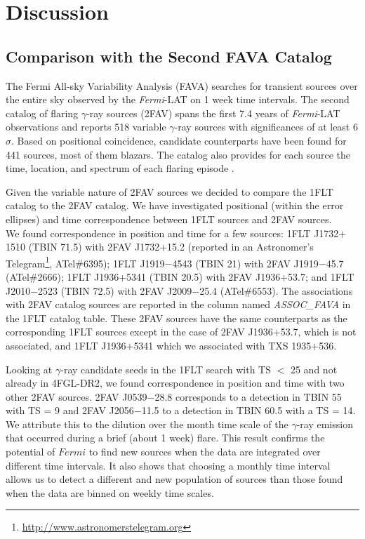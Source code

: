 \documentclass{aastex62}
\newcommand\fermilat{{\it Fermi}-LAT }
\begin{document}
\section{Discussion}\label{sec:discussion}

\subsection{Comparison with the Second FAVA Catalog}\label{sec:FAVA}
The Fermi All-sky Variability Analysis (FAVA) searches for transient sources over the entire sky observed by the \fermilat on 1 week time intervals. The second catalog of flaring $\gamma$-ray sources (2FAV) spans the first 7.4 years of \fermilat observations and reports 518 variable $\gamma$-ray sources with significances of at least 6$\sigma$. Based on positional coincidence, candidate counterparts have been found for 441 sources, most of them blazars. The catalog also provides for each source the time, location, and spectrum of each flaring episode \citep{abdollahi2017second2FAV}.

Given the variable nature of 2FAV sources we decided to compare the 1FLT catalog to the 2FAV catalog. We have investigated positional (within the error ellipses) and time correspondence between 1FLT sources and 2FAV sources.\\
We found correspondence in position and time for a few sources: 1FLT J1732$+$1510 (TBIN 71.5) with 2FAV J1732$+$15.2 (reported in an Astronomer’s Telegram\footnote{\url{http://www.astronomerstelegram.org}}, ATel$\#$6395); 1FLT J1919$-$4543 (TBIN 21) with 2FAV J1919$-$45.7 (ATel$\#$2666); 1FLT J1936+5341 (TBIN 20.5) with 2FAV J1936+53.7; and 1FLT J2010$-$2523 (TBIN 72.5) with 2FAV J2009$-$25.4 (ATel$\#$6553). The associations with 2FAV catalog sources are reported in the column named {\it ASSOC\_FAVA} in the 1FLT catalog table. These 2FAV sources have the same counterparts as the corresponding 1FLT sources except in the case of 2FAV J1936$+$53.7, which is not associated, and 1FLT J1936$+$5341 which we associated with TXS 1935$+$536.

Looking at $\gamma$-ray candidate seeds in the 1FLT search with TS  $<$ 25 and not already in 4FGL-DR2, we found correspondence in position and time with two other 2FAV sources. 2FAV J0539$-$28.8 corresponds to a detection in TBIN 55 with TS = 9 and 2FAV J2056$-$11.5 to a detection in TBIN 60.5 with a TS = 14. We attribute this to the dilution over the month time scale of the $\gamma$-ray emission that occurred during a brief (about 1 week) flare.
This result confirms the potential of $Fermi$ to find new sources when the data are integrated over different time intervals. 
It also shows that choosing a monthly time interval allows us to detect a different and new population of sources than those found when the data are binned on weekly time scales.
\end{document}

